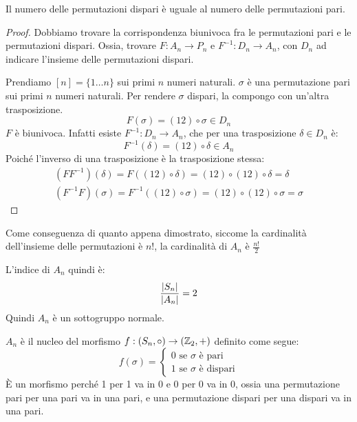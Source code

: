 \begin{prop}
Il numero delle permutazioni dispari \`e uguale al numero delle permutazioni pari.
\end{prop}
\begin{proof}
Dobbiamo trovare la corrispondenza biunivoca fra le permutazioni pari e le permutazioni dispari. Ossia, trovare $F : A_n \to P_n$ e $F^{-1} : D_n \to A_n$, con $D_n$ ad indicare l'insieme delle permutazioni dispari.

Prendiamo $[n] = \{ 1 \dots n \}$ sui primi $n$ numeri naturali. $\sigma$ \`e una permutazione pari sui primi $n$ numeri naturali. Per rendere $\sigma$ dispari, la compongo con un'altra trasposizione.
\[
F(\sigma) = (1 2) \circ \sigma \in D_n
\]
$F$ \`e biunivoca. Infatti esiste $F^{-1} : D_n \to A_n$, che per una trasposizione $\delta \in D_n$ \`e:
\[
F^{-1}(\delta) = (1 2) \circ \delta \in A_n
\]
Poich\'e l'inverso di una trasposizione \`e la trasposizione stessa:
\begin{gather*}
(F F^{-1}) (\delta) = F((1 2) \circ \delta) = (1 2) \circ (1 2) \circ \delta = \delta \\
(F^{-1} F) (\sigma) = F^{-1}((1 2) \circ \sigma) = (1 2) \circ (1 2) \circ \sigma = \sigma
\end{gather*}
\end{proof}
\begin{oss}
Come conseguenza di quanto appena dimostrato, siccome la cardinalit\`a dell'insieme delle permutazioni \`e $n!$, la cardinalit\`a di $A_n$ \`e $\frac{n!}{2}$
\end{oss}
\begin{oss}
L'indice di $A_n$ quindi \`e:
\[
\frac{\left\lvert{S_n}\right\rvert}{\left\lvert{A_n}\right\rvert} = 2
\]
Quindi $A_n$ \`e un sottogruppo normale.
\end{oss}
\begin{oss}
$A_n$ \`e il nucleo del morfismo $f : (S_n, \circ) \to (\mathbb{Z}_2, +)$ definito come segue:
\[
f (\sigma) = 
\begin{cases}
0 \text{ se } \sigma \text{ \`e pari} \\
1 \text{ se } \sigma \text{ \`e dispari} 
\end{cases}
\]
\`E un morfismo perch\'e 1 per 1 va in 0 e 0 per 0 va in 0, ossia una permutazione pari per una pari va in una pari, e una permutazione dispari per una dispari va in una pari.
\end{oss}

